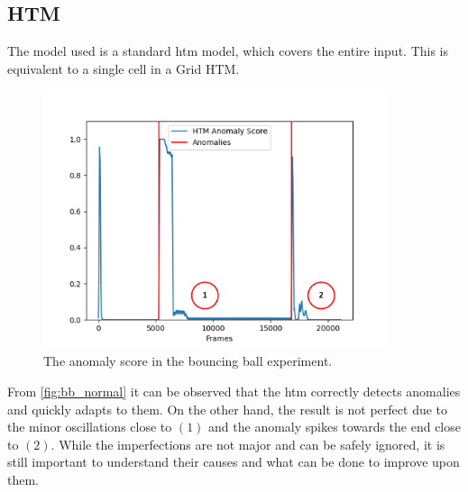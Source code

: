 \subsection{HTM}
The model used is a standard \gls*{htm} model, which covers the entire input. This is equivalent to a single cell in a Grid HTM.
\begin{figure}[H]
    \centering
    \includegraphics[width=0.9\textwidth]{resources/experiments/bouncing_ball/bb_anoms_bad.png}
    \caption[Bouncing Ball Experiment Anomaly Score]{The anomaly score in the bouncing ball experiment.}
    \label{fig:bb_normal}
\end{figure}
From \autoref{fig:bb_normal} it can be observed that the \gls*{htm} correctly detects anomalies and quickly adapts to them. On the other hand, the result is not perfect due to the minor oscillations close to $(1)$ and the anomaly spikes towards the end close to $(2)$. While the imperfections are not major and can be safely ignored, it is still important to understand their causes and what can be done to improve upon them. \par
